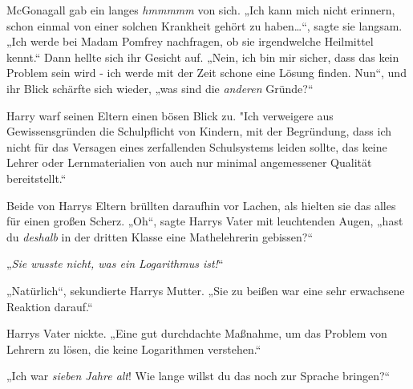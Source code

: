 McGonagall gab ein langes \emph{hmmmmm} von sich. „Ich kann mich nicht erinnern, schon einmal von einer solchen Krankheit gehört zu haben…“, sagte sie langsam. „Ich werde bei Madam Pomfrey nachfragen, ob sie irgendwelche Heilmittel kennt.“ Dann hellte sich ihr Gesicht auf. „Nein, ich bin mir sicher, dass das kein Problem sein wird - ich werde mit der Zeit schone eine Lösung finden. Nun“, und ihr Blick schärfte sich wieder, „was sind die \emph{anderen} Gründe?“

Harry warf seinen Eltern einen bösen Blick zu. "Ich verweigere aus Gewissensgründen die Schulpflicht von Kindern, mit der Begründung, dass ich nicht für das Versagen eines zerfallenden Schulsystems leiden sollte, das keine Lehrer oder Lernmaterialien von auch nur minimal angemessener Qualität bereitstellt.“

Beide von Harrys Eltern brüllten daraufhin vor Lachen, als hielten sie das alles für einen großen Scherz. „Oh“, sagte Harrys Vater mit leuchtenden Augen, „hast du \emph{deshalb} in der dritten Klasse eine Mathelehrerin gebissen?“

„\emph{Sie wusste nicht, was ein Logarithmus ist!}“

„Natürlich“, sekundierte Harrys Mutter. „Sie zu beißen war eine sehr erwachsene Reaktion darauf.“

Harrys Vater nickte. „Eine gut durchdachte Maßnahme, um das Problem von Lehrern zu lösen, die keine Logarithmen verstehen.“

„Ich war \emph{sieben Jahre alt}! Wie lange willst du das noch zur Sprache bringen?“

